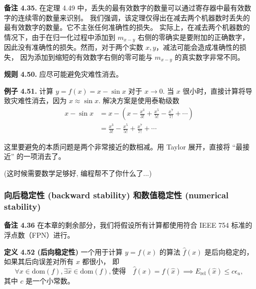 \documentclass[a4paper]{ctexart}
\begin{document}
{\noindent \textbf{备注 4.35.} 在定理 4.49 中，丢失的最有效数字的数量可以通过寄存器中最有效数字的连续零的数量来识别。
我们强调，该定理仅得出在减去两个机器数时丢失的最有效数字的数量。它不主张任何准确性的损失。
实际上，在减去两个机器数的情况下，由于在归一化过程中添加到 $m_{x-y}$ 右侧的零确实是要附加的正确数字，
因此没有准确性的损失。然而，对于两个实数 $x, y$，减法可能会造成准确性的损失，
因为添加到缩短的有效数字右侧的零可能与 $m_{x-y}$ 的真实数字非常不同。

\noindent \textbf{规则 4.50.} 应尽可能避免灾难性消去。

\noindent \textbf{例子 4.51.} 计算 $y = f(x) = x - \sin x$ 对于 $x \rightarrow 0$. 
当 $x$ 很小时，直接计算将导致灾难性消去，因为 $x \approx \sin x$. 解决方案是使用泰勒级数
\begin{align*}
  x - \sin x &= x - \left(x - \frac{x^3}{3!} + \frac{x^5}{5!} - \frac{x^7}{7!} + \cdots\right) \\
  &= \frac{x^3}{3!} - \frac{x^5}{5!} + \frac{x^7}{7!} + \cdots
\end{align*}

这里要避免的本质问题是两个非常接近的数相减。用 Taylor 展开，直接将 ``最接近'' 的一项消去了。



(这时候需要数学足够好,
编程帮不了你什么了...)

\subsubsection{向后稳定性 (backward stability) 和数值稳定性 (numerical stability)}

\noindent \textbf{备注 4.36 } 在本章的剩余部分，我们将假设所有计算都使用符合 IEEE 754 标准的浮点数（FPN）进行。

\noindent \textbf{定义 4.52 (后向稳定性) } 一个用于计算 $y = f(x)$ 的算法 $\hat{f}(x)$ 是后向稳定的，如果其后向误差对所有 $x$ 都很小，
即
\[
\forall x \in \text{dom}(f), \exists \hat{x} \in \text{dom}(f), 
\text{使得} \quad \hat{f}(x) = f(\hat{x}) \implies E_{\text{rel}}(\hat{x}) \leq c\epsilon_u, \tag{4.27}
\]
其中 $c$ 是一个小常数。

}
\end{document}
